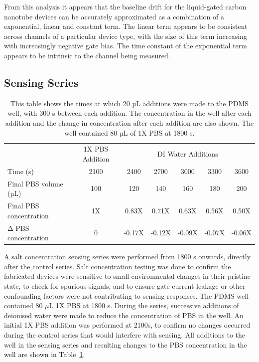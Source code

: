 \documentclass[
  a4paper,
]{scrbook}
\begin{document}
From this analysis it appears that the baseline drift for the
liquid-gated carbon nanotube devices can be accurately approximated as a
combination of a exponential, linear and constant term. The linear term
appears to be consistent across channels of a particular device type,
with the size of this term increasing with increasingly negative gate
bias. The time constant of the exponential term appears to be intrinsic
to the channel being measured.

\hypertarget{sensing-series}{%
\subsection{Sensing Series}\label{sensing-series}}

\hypertarget{tbl-salt-conc-series}{}
\begin{table}
\caption{\label{tbl-salt-conc-series}This table shows the times at which 20 µL additions were made to the
PDMS well, with 300 s between each addition. The concentration in the
well after each addition and the change in concentration after each
addition are also shown. The well contained 80 µL of 1X PBS at 1800 s. }\tabularnewline

\centering
\begin{tabular}{lcccccc}
\toprule
\multicolumn{1}{c}{ } & \multicolumn{1}{c}{1X PBS Addition} & \multicolumn{5}{c}{DI Water Additions} \\
\cmidrule(l{3pt}r{3pt}){2-2} \cmidrule(l{3pt}r{3pt}){3-7}
Time (s) & 2100 & 2400 & 2700 & 3000 & 3300 & 3600\\
Final PBS volume (µL) & 100 & 120 & 140 & 160 & 180 & 200\\
Final PBS concentration & 1X & 0.83X & 0.71X & 0.63X & 0.56X & 0.50X\\
Δ PBS concentration & 0 & -0.17X & -0.12X & -0.09X & -0.07X & -0.06X\\
\bottomrule
\end{tabular}
\end{table}

A salt concentration sensing series were performed from 1800 s onwards,
directly after the control series. Salt concentration testing was done
to confirm the fabricated devices were sensitive to small environmental
changes in their pristine state, to check for spurious signals, and to
ensure gate current leakage or other confounding factors were not
contributing to sensing responses. The PDMS well contained 80 \(\mu\)L
1X PBS at 1800 s. During the series, successive additions of deionised
water were made to reduce the concentration of PBS in the well. An
initial 1X PBS addition was performed at 2100s, to confirm no changes
occurred during the control series that would interfere with sensing.
All additions to the well in the sensing series and resulting changes to
the PBS concentration in the well are shown in
Table~\ref{tbl-salt-conc-series}.
\end{document}
